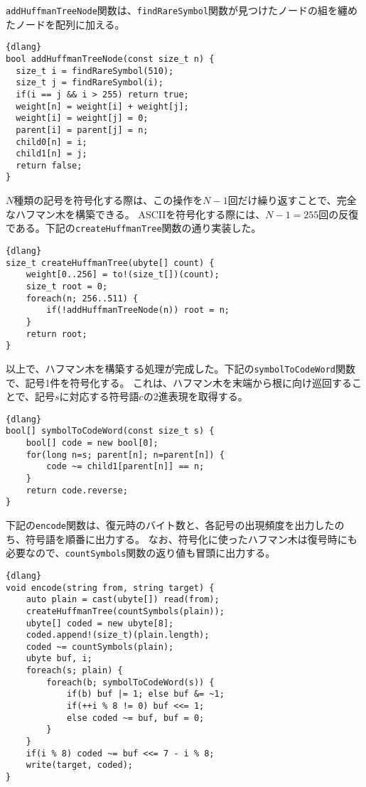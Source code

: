 \documentclass[10pt,a4paper]{book}
\begin{document}
\texttt{addHuffmanTreeNode}関数は、\texttt{findRareSymbol}関数が見つけたノードの組を纏めたノードを配列に加える。

\begin{Verbatim}{dlang}
bool addHuffmanTreeNode(const size_t n) {
  size_t i = findRareSymbol(510);
  size_t j = findRareSymbol(i);
  if(i == j && i > 255) return true;
  weight[n] = weight[i] + weight[j];
  weight[i] = weight[j] = 0;
  parent[i] = parent[j] = n;
  child0[n] = i;
  child1[n] = j;
  return false;
}
\end{Verbatim}

$N$種類の記号を符号化する際は、この操作を$N\!-\!1$回だけ繰り返すことで、完全なハフマン木を構築できる。
ASCIIを符号化する際には、$N\!-\!1\!=\!255$回の反復である。下記の\texttt{createHuffmanTree}関数の通り実装した。

\begin{Verbatim}{dlang}
size_t createHuffmanTree(ubyte[] count) {
	weight[0..256] = to!(size_t[])(count);
	size_t root = 0;
	foreach(n; 256..511) {
		if(!addHuffmanTreeNode(n)) root = n;
	}
	return root;
}
\end{Verbatim}

以上で、ハフマン木を構築する処理が完成した。下記の\texttt{symbolToCodeWord}関数で、記号1件を符号化する。
これは、ハフマン木を末端から根に向け巡回することで、記号$s$に対応する符号語$c$の2進表現を取得する。

\begin{Verbatim}{dlang}
bool[] symbolToCodeWord(const size_t s) {
	bool[] code = new bool[0];
	for(long n=s; parent[n]; n=parent[n]) {
		code ~= child1[parent[n]] == n;
	}
	return code.reverse;
}
\end{Verbatim}

下記の\texttt{encode}関数は、復元時のバイト数と、各記号の出現頻度を出力したのち、符号語を順番に出力する。
なお、符号化に使ったハフマン木は復号時にも必要なので、\texttt{countSymbols}関数の返り値も冒頭に出力する。

\begin{Verbatim}{dlang}
void encode(string from, string target) {
	auto plain = cast(ubyte[]) read(from);
	createHuffmanTree(countSymbols(plain));
	ubyte[] coded = new ubyte[8];
	coded.append!(size_t)(plain.length);
	coded ~= countSymbols(plain);
	ubyte buf, i;
	foreach(s; plain) {
		foreach(b; symbolToCodeWord(s)) {
			if(b) buf |= 1; else buf &= ~1;
			if(++i % 8 != 0) buf <<= 1;
			else coded ~= buf, buf = 0;
		}
	}
	if(i % 8) coded ~= buf <<= 7 - i % 8;
	write(target, coded);
}
\end{Verbatim}
\end{document}

